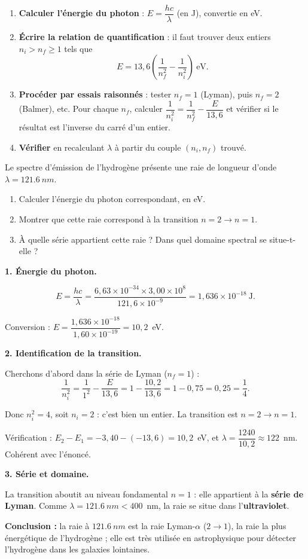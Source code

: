 \documentclass[11pt]{article}
\begin{document}
\begin{methode}
\begin{enumerate}
\item \textbf{Calculer l'énergie du photon} : $E = \dfrac{hc}{\lambda}$ (en J), convertie en eV.
\item \textbf{Écrire la relation de quantification} : il faut trouver deux entiers $n_i > n_f \geq 1$ tels que
\[
E = 13{,}6\left(\frac{1}{n_f^2} - \frac{1}{n_i^2}\right)~\text{eV}.
\]
\item \textbf{Procéder par essais raisonnés} : tester $n_f = 1$ (Lyman), puis $n_f = 2$ (Balmer), etc. Pour chaque $n_f$, calculer $\dfrac{1}{n_i^2} = \dfrac{1}{n_f^2} - \dfrac{E}{13{,}6}$ et vérifier si le résultat est l'inverse du carré d'un entier.
\item \textbf{Vérifier} en recalculant $\lambda$ à partir du couple $(n_i, n_f)$ trouvé.
\end{enumerate}
\end{methode}

\begin{exoresolu}
Le spectre d'émission de l'hydrogène présente une raie de longueur d'onde $\lambda = \SI{121,6}{nm}$.
\begin{enumerate}
\item Calculer l'énergie du photon correspondant, en eV.
\item Montrer que cette raie correspond à la transition $n=2 \to n=1$.
\item À quelle série appartient cette raie ? Dans quel domaine spectral se situe-t-elle ?
\end{enumerate}
\tcblower
\textbf{1. Énergie du photon.}

\[
E = \frac{hc}{\lambda} = \frac{6{,}63\times 10^{-34}\times 3{,}00\times 10^{8}}{121{,}6\times 10^{-9}} = 1{,}636\times 10^{-18}~\text{J}.
\]

Conversion : $E = \dfrac{1{,}636\times 10^{-18}}{1{,}60\times 10^{-19}} = 10{,}2$~eV.

\textbf{2. Identification de la transition.}

Cherchons d'abord dans la série de Lyman ($n_f = 1$) :
\[
\frac{1}{n_i^2} = \frac{1}{1^2} - \frac{E}{13{,}6} = 1 - \frac{10{,}2}{13{,}6} = 1 - 0{,}75 = 0{,}25 = \frac{1}{4}.
\]

Donc $n_i^2 = 4$, soit $n_i = 2$ : c'est bien un entier. La transition est $n = 2 \to n = 1$.

Vérification : $E_2 - E_1 = -3{,}40 - (-13{,}6) = 10{,}2$~eV, et $\lambda = \dfrac{1240}{10{,}2} \approx 122$~nm. Cohérent avec l'énoncé.

\textbf{3. Série et domaine.}

La transition aboutit au niveau fondamental $n=1$ : elle appartient à la \textbf{série de Lyman}. Comme $\lambda = \SI{121,6}{nm} < 400$~nm, la raie se situe dans l'\textbf{ultraviolet}.

\textbf{Conclusion :} la raie à $\SI{121,6}{nm}$ est la raie Lyman-$\alpha$ ($2 \to 1$), la raie la plus énergétique de l'hydrogène ; elle est très utilisée en astrophysique pour détecter l'hydrogène dans les galaxies lointaines.
\end{exoresolu}
\end{document}
